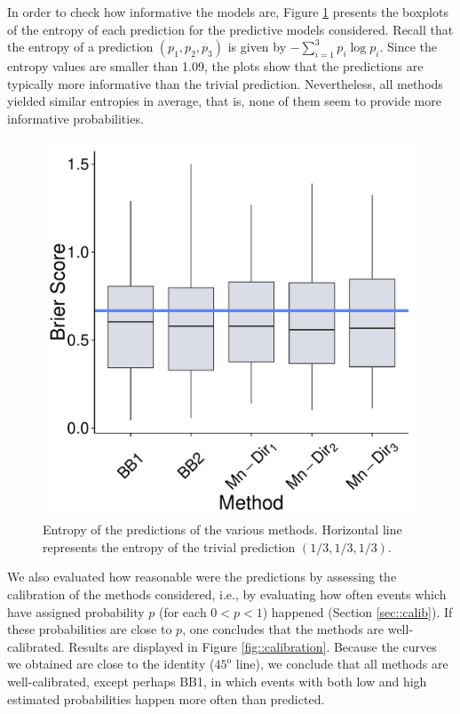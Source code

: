 \documentclass[journal,article,accept,moreauthors,pdftex,12pt,a4paper]{mdpi}
\begin{document}
	In order to check how informative the models are, Figure \ref{fig::entropy} presents the boxplots of the entropy of each prediction for the predictive models considered. Recall
	that the entropy of a prediction $(p_1,p_2,p_3)$ is given by $- \sum_{i=1}^3 p_i \log{p_i}$.
	Since the entropy values are smaller than 1.09, the plots show that the predictions
	are typically more informative than the trivial prediction. Nevertheless, all methods yielded similar entropies in average, that is,
	none of them seem to provide more informative probabilities.
	
	
	
	\begin{figure}[H]
		\centering
		\includegraphics[page=10,scale=0.3]{futebolComparacaoModelosForPaper.pdf}
		\caption{Entropy of the predictions of the various methods. Horizontal line represents the entropy of the trivial prediction $(1/3,1/3,1/3)$.}
		\label{fig::entropy}
	\end{figure}
	
	
		
	We also evaluated how reasonable were the predictions by assessing the calibration of the methods considered, i.e., by evaluating how often events which have assigned probability $p$ (for each $0<p<1$) happened (Section \ref{sec::calib}).
	If these probabilities are close to $p$, one concludes that the methods are well-calibrated.
	Results are displayed in Figure \ref{fig::calibration}.
	Because the curves we obtained are close to the identity ($45^{\text{o}}$ line), we conclude that all methods are well-calibrated, except perhaps BB1, in which events with both low and high estimated probabilities happen more often
	than predicted.
	
\end{document}
